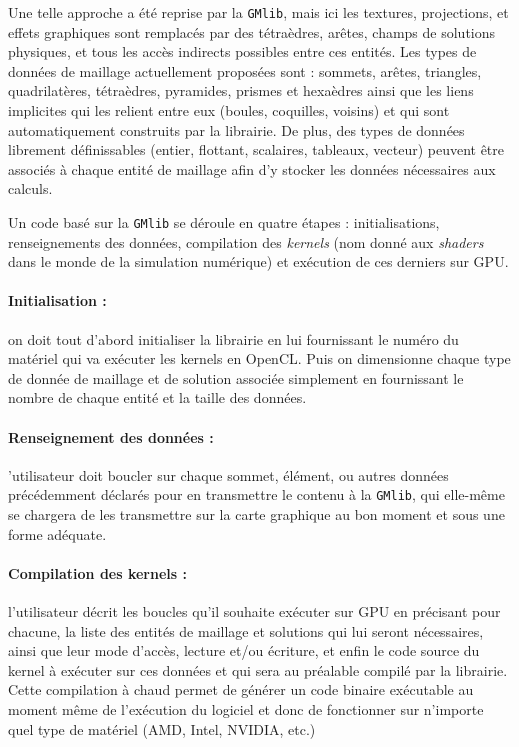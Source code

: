 \documentclass[a4paper,12pt]{article}
\begin{document}
Une telle approche a été reprise par la {\tt GMlib}, mais ici les textures, projections, et effets graphiques sont remplacés par des tétraèdres, arêtes, champs de solutions physiques, et tous les accès indirects possibles entre ces entités.
Les types de données de maillage actuellement proposées sont : sommets, arêtes, triangles, quadrilatères, tétraèdres, pyramides, prismes et hexaèdres ainsi que les liens implicites qui les relient entre eux (boules, coquilles, voisins) et qui sont automatiquement construits par la librairie.
De plus, des types de données librement définissables (entier, flottant, scalaires, tableaux, vecteur) peuvent être associés à chaque entité de maillage afin d'y stocker les données nécessaires aux calculs.

Un code basé sur la {\tt GMlib} se déroule en quatre étapes : initialisations, renseignements des données, compilation des \emph{kernels} (nom donné aux \emph{shaders} dans le monde de la simulation numérique) et exécution de ces derniers sur GPU.

\paragraph{Initialisation :} on doit tout d'abord initialiser la librairie en lui fournissant le numéro du matériel qui va exécuter les kernels en OpenCL. Puis on dimensionne chaque type de donnée de maillage et de solution associée simplement en fournissant le nombre de chaque entité et la taille des données.

\paragraph{Renseignement des données :} 'utilisateur doit boucler sur chaque sommet, élément, ou autres données précédemment déclarés pour en transmettre le contenu à la {\tt GMlib}, qui elle-même se chargera de les transmettre sur la carte graphique au bon moment et sous une forme adéquate.

\paragraph{Compilation des kernels :} l'utilisateur décrit les boucles qu'il souhaite exécuter sur GPU en précisant pour chacune, la liste des entités de maillage et solutions qui lui seront nécessaires, ainsi que leur mode d'accès, lecture et/ou écriture, et enfin le code source du kernel à exécuter sur ces données et qui sera au préalable compilé par la librairie.
Cette compilation à chaud permet de générer un code binaire exécutable au moment même de l'exécution du logiciel et donc de fonctionner sur n'importe quel type de matériel (AMD, Intel, NVIDIA, etc.)
\end{document}
